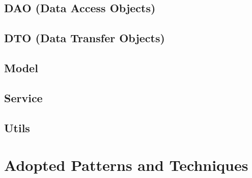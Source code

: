\subsection*{DAO (Data Access Objects)}
\subsection*{DTO (Data Transfer Objects)}
\subsection*{Model}
\subsection*{Service}
\subsection*{Utils}


\section{Adopted Patterns and Techniques}

